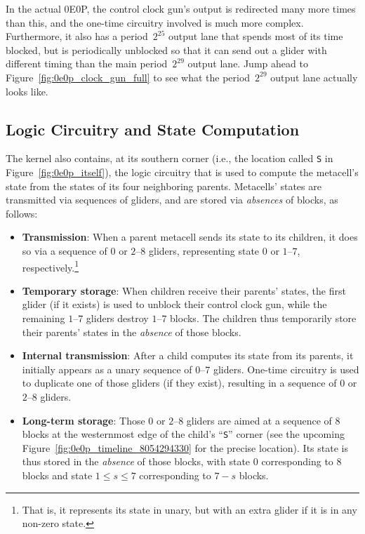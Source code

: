 In the actual 0E0P, the control clock gun's output is redirected many more times than this, and the one-time circuitry involved is much more complex. Furthermore, it also has a period~$2^{25}$ output lane that spends most of its time blocked, but is periodically unblocked so that it can send out a glider with different timing than the main period~$2^{29}$ output lane. Jump ahead to Figure~\ref{fig:0e0p_clock_gun_full} to see what the period~$2^{29}$ output lane actually looks like.


\subsection{Logic Circuitry and State Computation}\label{sec:0e0p_structure_logic}

The kernel also contains, at its southern corner (i.e., the location called \texttt{S} in Figure~\ref{fig:0e0p_itself}), the logic circuitry that is used to compute the metacell's state from the states of its four neighboring parents. Metacells' states are transmitted via sequences of gliders, and are stored via \emph{absences} of blocks, as follows:\smallskip

\begin{itemize}
	\item \textbf{Transmission}: When a parent metacell sends its state to its children, it does so via a sequence of $0$ or $2$--$8$ gliders, representing state $0$ or $1$--$7$, respectively.\footnote{That is, it represents its state in unary, but with an extra glider if it is in any non-zero state.}\smallskip
	
	\item \textbf{Temporary storage}: When children receive their parents' states, the first glider (if it exists) is used to unblock their control clock gun, while the remaining $1$--$7$ gliders destroy $1$--$7$ blocks. The children thus temporarily store their parents' states in the \emph{absence} of those blocks.\smallskip
	
	\item \textbf{Internal transmission}: After a child computes its state from its parents, it initially appears as a unary sequence of $0$--$7$ gliders. One-time circuitry is used to duplicate one of those gliders (if they exist), resulting in a sequence of $0$ or $2$--$8$ gliders.\smallskip
	
	\item \textbf{Long-term storage}: Those $0$ or $2$--$8$ gliders are aimed at a sequence of $8$ blocks at the westernmost edge of the child's ``\texttt{S}'' corner (see the upcoming Figure~\ref{fig:0e0p_timeline_8054294330} for the precise location). Its state is thus stored in the \emph{absence} of those blocks, with state $0$ corresponding to $8$ blocks and state $1 \leq s \leq 7$ corresponding to $7 - s$ blocks.\smallskip
\end{itemize}

